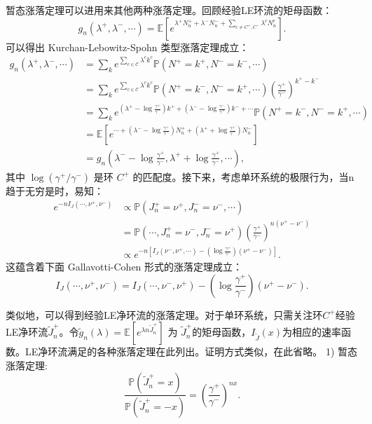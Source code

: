 暂态涨落定理可以进用来其他两种涨落定理。回顾经验LE环流的矩母函数：
\begin{equation*}
    g_n(\lambda^+,\lambda^-,\cdots)
    = \mathbb{E}\left[e^{\lambda^+N^+_n+\lambda^-N^-_n+\sum_{c\neq C^+,C^-}\lambda^cN^c_n}\right].
\end{equation*}
可以得出 Kurchan-Lebowitz-Spohn 类型涨落定理成立：
\begin{align*}
    g_n(\lambda^+,\lambda^-,\cdots)
    &= \sum_{k}e^{\sum_{c\in\mathcal{C}}\lambda^ck^c}\mathbb{P}\left(N^+=k^+,N^-=k^-,\cdots\right)\\
    &= \sum_{k}e^{\sum_{c\in\mathcal{C}}\lambda^ck^c}
    \mathbb{P}\left(N^+=k^-,N^-=k^+,\cdots\right) \left(\frac{\gamma^+}{\gamma^-}\right)^{k^+-k^-}\\
    &= \sum_{k}e^{\left(\lambda^+-\log\frac{\gamma^+}{\gamma^-}\right)k^++
    \left(\lambda^--\log\frac{\gamma^-}{\gamma^+}\right)k^-+\cdots}\mathbb{P}(N^+=k^-,N^-=k^+,\cdots)\\
    &= \mathbb{E}\left[e^{\cdots+\left(\lambda^--\log\frac{\gamma^+}{\gamma^-}\right)N^+_n+
    \left(\lambda^++\log\frac{\gamma^+}{\gamma^-}\right)N^-_n}\right]\\
    &= g_n\left(\lambda^--\log\frac{\gamma^+}{\gamma^-},
    \lambda^++\log\frac{\gamma^+}{\gamma^-},\cdots\right),
\end{align*}
其中 $\log(\gamma^+/\gamma^-)$ 是环 $C^+$ 的匹配度。接下来，考虑单环系统的极限行为，当n趋于无穷是时，易知：
\begin{align*}
e^{-nI_J(\cdots,\nu^+,\nu^-)}
&\propto \mathbb{P}\left(J^+_n=\nu^+, J^-_n=\nu^-, \cdots\right)\\
&= \mathbb{P}\left(\cdots,J^+_n=\nu^-, J^-_n=\nu^+\right)
\left(\frac{\gamma^+}{\gamma^-}\right)^{n(\nu^+-\nu^-)}\\
&\propto e^{-n\left[I_J(\nu^-,\nu^+,\cdots)-\left(\log\frac{\gamma^+}{\gamma^-}\right)
(\nu^+-\nu^-)\right]}.
\end{align*}
这蕴含着下面 Gallavotti-Cohen 形式的涨落定理成立：
\begin{equation}\label{G-C type fluctuation}
    I_J(\cdots,\nu^+,\nu^-)=I_J(\cdots,\nu^-,\nu^+)-\left(\log\frac{\gamma^+}{\gamma^-}\right)(\nu^+-\nu^-).
\end{equation}

类似地，可以得到经验LE净环流的涨落定理。对于单环系统，只需关注环$C^+$经验LE净环流$\tilde{J}_n^+$。令$\tilde{g}_n(\lambda) = \mathbb{E}[e^{\lambda n\tilde{J}^+_n}]$ 为 $\tilde{J}^+_n$的矩母函数，$I_{\tilde{J}}(x)$为相应的速率函数。LE净环流满足的各种涨落定理在此列出。证明方式类似，在此省略。
1) 暂态涨落定理:
\begin{equation*}
\frac{\mathbb{P}(\tilde{J}^+_n=x)}{\mathbb{P}(\tilde{J}^+_n=-x)}
= \left(\frac{\gamma^+}{\gamma^-}\right)^{nx}.
\end{equation*}


